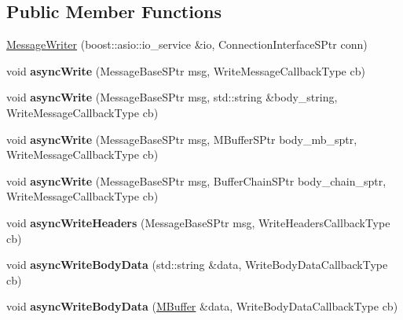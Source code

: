 \subsection*{Public Member Functions}
\begin{DoxyCompactItemize}
\item 
\hyperlink{class_message_writer_a92f4d619f9ef47dee6237d2826ab6b18}{Message\+Writer} (boost\+::asio\+::io\+\_\+service \&io, Connection\+Interface\+S\+Ptr conn)
\item 
\mbox{\label{class_message_writer_a23d55794db33f0d677505190b65943e8}} 
void {\bfseries async\+Write} (Message\+Base\+S\+Ptr msg, Write\+Message\+Callback\+Type cb)
\item 
\mbox{\label{class_message_writer_a64ef95415e3dc628ac4033675285511c}} 
void {\bfseries async\+Write} (Message\+Base\+S\+Ptr msg, std\+::string \&body\+\_\+string, Write\+Message\+Callback\+Type cb)
\item 
\mbox{\label{class_message_writer_a64f2202b6058d2817de987fa1bab056b}} 
void {\bfseries async\+Write} (Message\+Base\+S\+Ptr msg, M\+Buffer\+S\+Ptr body\+\_\+mb\+\_\+sptr, Write\+Message\+Callback\+Type cb)
\item 
\mbox{\label{class_message_writer_a00aa34b356034fc0c49303c7cac5498e}} 
void {\bfseries async\+Write} (Message\+Base\+S\+Ptr msg, Buffer\+Chain\+S\+Ptr body\+\_\+chain\+\_\+sptr, Write\+Message\+Callback\+Type cb)
\item 
\mbox{\label{class_message_writer_ae4c41c55e28ed99c5535f859fdae7abf}} 
void {\bfseries async\+Write\+Headers} (Message\+Base\+S\+Ptr msg, Write\+Headers\+Callback\+Type cb)
\item 
\mbox{\label{class_message_writer_a4cab5e912c1cb51d23fa76792b3e6eda}} 
void {\bfseries async\+Write\+Body\+Data} (std\+::string \&data, Write\+Body\+Data\+Callback\+Type cb)
\item 
\mbox{\label{class_message_writer_ab86abed828afa7fbd30e300c585d1d31}} 
void {\bfseries async\+Write\+Body\+Data} (\hyperlink{struct_m_buffer}{M\+Buffer} \&data, Write\+Body\+Data\+Callback\+Type cb)

\end{DoxyCompactItemize}
